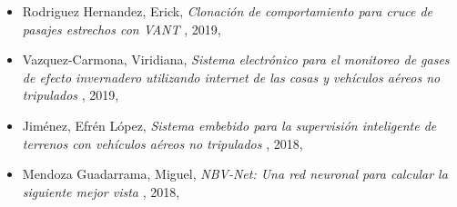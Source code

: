 \begin{itemize} 
\item Rodriguez Hernandez, Erick, \textit{ Clonaci\'on de comportamiento para cruce de pasajes estrechos con VANT }, 2019, \href{ https://jivasquez.files.wordpress.com/2019/08/tesiserhempastar.pdf }{\faFilePdfO} 
\item Vazquez-Carmona, Viridiana, \textit{ Sistema electr\'onico para el monitoreo de gases de efecto invernadero utilizando internet de las cosas y veh\'iculos a\'ereos no tripulados }, 2019, \href{ https://jivasquez.files.wordpress.com/2020/09/2019_maestria_vazquez.pdf }{\faFilePdfO} 
\item Jim{\'e}nez, Efr{\'e}n L{\'o}pez, \textit{ Sistema embebido para la supervisi{\'o}n inteligente de terrenos con veh{\'i}culos a{\'e}reos no tripulados }, 2018, \href{ https://jivasquez.files.wordpress.com/2018/12/master_thesis_2018_lopez.pdf }{\faFilePdfO} 
\item Mendoza Guadarrama, Miguel, \textit{ NBV-Net: Una red neuronal para calcular la siguiente mejor vista }, 2018, \href{ https://jivasquez.files.wordpress.com/2018/12/2018_maestria_Mendoza.pdf }{\faFilePdfO} 
\end{itemize} 

